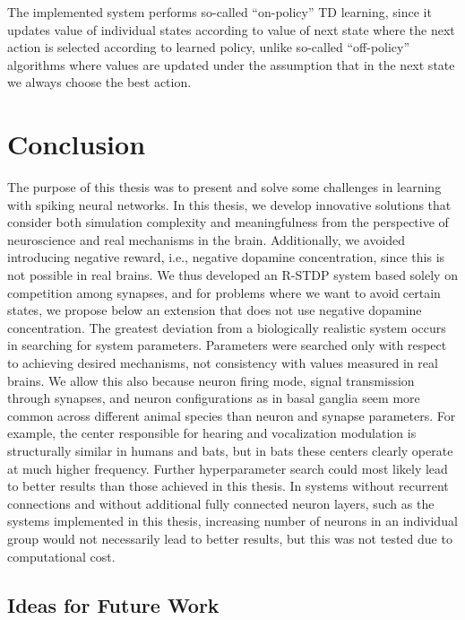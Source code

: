 \documentclass[a4paper,12pt,openright]{book}
\begin{document}
The implemented system performs so-called ``on-policy'' TD learning, since it updates value of individual states according to value of next state where the next action is selected according to learned policy, unlike so-called ``off-policy'' algorithms where values are updated under the assumption that in the next state we always choose the best action.

\chapter{Conclusion}
The purpose of this thesis was to present and solve some challenges in learning with spiking neural networks. In this thesis, we develop innovative solutions that consider both simulation complexity and meaningfulness from the perspective of neuroscience and real mechanisms in the brain. Additionally, we avoided introducing negative reward, i.e., negative dopamine concentration, since this is not possible in real brains. We thus developed an R-STDP system based solely on competition among synapses, and for problems where we want to avoid certain states, we propose below an extension that does not use negative dopamine concentration. The greatest deviation from a biologically realistic system occurs in searching for system parameters. Parameters were searched only with respect to achieving desired mechanisms, not consistency with values measured in real brains. We allow this also because neuron firing mode, signal transmission through synapses, and neuron configurations as in basal ganglia seem more common across different animal species than neuron and synapse parameters. For example, the center responsible for hearing and vocalization modulation is structurally similar in humans and bats, but in bats these centers clearly operate at much higher frequency. %
Further hyperparameter search could most likely lead to better results than those achieved in this thesis. In systems without recurrent connections and without additional fully connected neuron layers, such as the systems implemented in this thesis, increasing number of neurons in an individual group would not necessarily lead to better results, but this was not tested due to computational cost.

\section{Ideas for Future Work}
\end{document}

